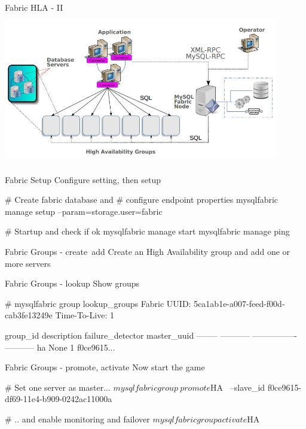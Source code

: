 \documentclass{beamer}[10]
\begin{document}
\begin{pyframe}{Fabric HLA - II}
\includegraphics[height=6.6cm,width=12cm]{images/mysql-fabric-hla.jpg}
\end{pyframe}


\begin{pyframe}{Fabric Setup}
Configure  setting, then setup
\begin{bashcode}
# Create fabric database and
# configure endpoint properties
mysqlfabric manage setup --param=storage.user=fabric

# Startup and check if ok
mysqlfabric manage start
mysqlfabric manage ping
\end{bashcode}
\end{pyframe}


\begin{pyframe}{Fabric Groups - create\, add}
Create an High Availability group and add one or more servers
\end{pyframe}


\begin{pyframe}{Fabric Groups - lookup}
Show groups
\begin{bashcode}
# mysqlfabric group lookup_groups
Fabric UUID:  5ca1ab1e-a007-feed-f00d-cab3fe13249e
Time-To-Live: 1

group_id description failure_detector master_uuid
-------- ----------- ---------------- -----------
      ha        None                1 f0ce9615...

\end{bashcode}
\end{pyframe}

\begin{pyframe}{Fabric Groups - promote, activate}
Now start the game
\begin{bashcode}
# Set one server as master...
$ mysqlfabric group \
    promote $HA \
     --slave_id f0ce9615-df69-11e4-b909-0242ac11000a

# .. and enable monitoring and failover
$ mysqlfabric group activate $HA
\end{bashcode}
\end{pyframe}
\end{document}
